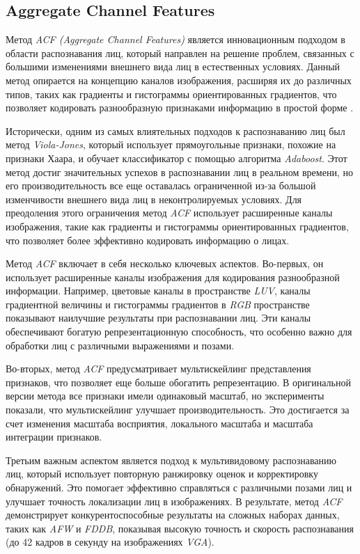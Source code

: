 \subsection{Aggregate Channel Features}
Метод \textit{ACF (Aggregate Channel Features)} является инновационным подходом в области распознавания лиц, который направлен на решение проблем, связанных с большими изменениями внешнего вида лиц в естественных условиях. Данный метод опирается на концепцию каналов изображения, расширяя их до различных типов, таких как градиенты и гистограммы ориентированных градиентов, что позволяет кодировать разнообразную признаками информацию в простой форме \cite{ACF}.

Исторически, одним из самых влиятельных подходов к распознаванию лиц был метод \textit{Viola-Jones}, который использует прямоугольные признаки, похожие на признаки Хаара, и обучает классификатор с помощью алгоритма \textit{Adaboost}. Этот метод достиг значительных успехов в распознавании лиц в реальном времени, но его производительность все еще оставалась ограниченной из-за большой изменчивости внешнего вида лиц в неконтролируемых условиях. Для преодоления этого ограничения метод \textit{ACF} использует расширенные каналы изображения, такие как градиенты и гистограммы ориентированных градиентов, что позволяет более эффективно кодировать информацию о лицах.

Метод \textit{ACF} включает в себя несколько ключевых аспектов. Во-первых, он использует расширенные каналы изображения для кодирования разнообразной информации. Например, цветовые каналы в пространстве \textit{LUV}, каналы градиентной величины и гистограммы градиентов в \textit{RGB} пространстве показывают наилучшие результаты при распознавании лиц. Эти каналы обеспечивают богатую репрезентационную способность, что особенно важно для обработки лиц с различными выражениями и позами.

Во-вторых, метод \textit{ACF} предусматривает мультискейлинг представления признаков, что позволяет еще больше обогатить репрезентацию. В оригинальной версии метода все признаки имели одинаковый масштаб, но эксперименты показали, что мультискейлинг улучшает производительность. Это достигается за счет изменения масштаба восприятия, локального масштаба и масштаба интеграции признаков.

Третьим важным аспектом является подход к мультивидовому распознаванию лиц, который использует повторную ранжировку оценок и корректировку обнаружений. Это помогает эффективно справляться с различными позами лиц и улучшает точность локализации лиц в изображениях. В результате, метод \textit{ACF} демонстрирует конкурентоспособные результаты на сложных наборах данных, таких как \textit{AFW} и \textit{FDDB}, показывая высокую точность и скорость распознавания (до 42 кадров в секунду на изображениях \textit{VGA}).

